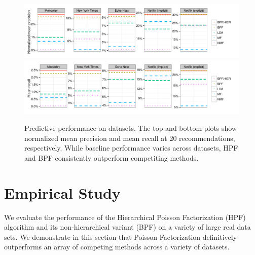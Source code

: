 
\begin{figure}[t!]
\centering
\includegraphics[width=\textwidth]{figures/mean_precision_at_20.pdf}\\
\includegraphics[width=\textwidth]{figures/mean_recall_at_20.pdf}\\
\caption{Predictive performance on datasets. The top and bottom plots
  show normalized mean precision and mean recall at 20
  recommendations, respectively. While baseline performance varies
  across datasets, HPF and BPF consistently outperform competiting
  methods.}
\label{fig:precision_recall_at_10}
\end{figure}


\section{Empirical Study}
We evaluate the performance of the Hierarchical Poisson Factorization
(HPF) algorithm and its non-hierarchical variant (BPF) on a variety of
large real data sets. We demonstrate in this section that Poisson
Factorization definitively outperforms an array of competing methods
across a variety of datasets.

